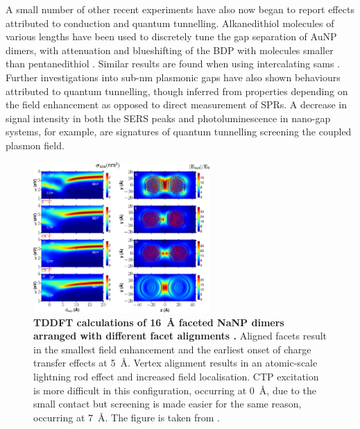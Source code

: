\documentclass{article}
\begin{document}
A small number of other recent experiments have also now began to report effects attributed to conduction and quantum tunnelling. Alkanedithiol molecules of various lengths have been used to discretely tune the gap separation of AuNP dimers, with attenuation and blueshifting of the BDP with molecules smaller than pentanedithiol \cite{cha2014}. Similar results are found when using intercalating \glspl{sam} \cite{tan2014}.
Further investigations into sub-nm plasmonic gaps have also shown behaviours attributed to quantum tunnelling, though inferred from properties depending on the field enhancement as opposed to direct measurement of SPRs. A decrease in signal intensity in both the SERS peaks \cite{zhu2014} and photoluminescence \cite{kravtsov2014} in nano-gap systems, for example, are signatures of quantum tunnelling screening the coupled plasmon field.

\begin{figure}[bt]
\centering
\includegraphics[width=0.6\textwidth]{figures/literature/nl-2015-007593_0001}
\caption[TDDFT calculations of \SI{16}{\angstrom} faceted NaNP dimers arranged with different facet alignments \cite{barbry2015}]{\textbf{TDDFT calculations of \SI{16}{\angstrom} faceted NaNP dimers arranged with different facet alignments \cite{barbry2015}.} Aligned facets result in the smallest field enhancement and the earliest onset of charge transfer effects at \SI{5}{\angstrom}. Vertex alignment results in an atomic-scale lightning rod effect and increased field localisation. CTP excitation is more difficult in this configuration, occurring at \SI{0}{\angstrom}, due to the small contact but screening is made easier for the same reason, occurring at \SI{7}{\angstrom}. The figure is taken from \cite{barbry2015}.}
\label{fig:atomic_morphology}
\end{figure}
\end{document}
